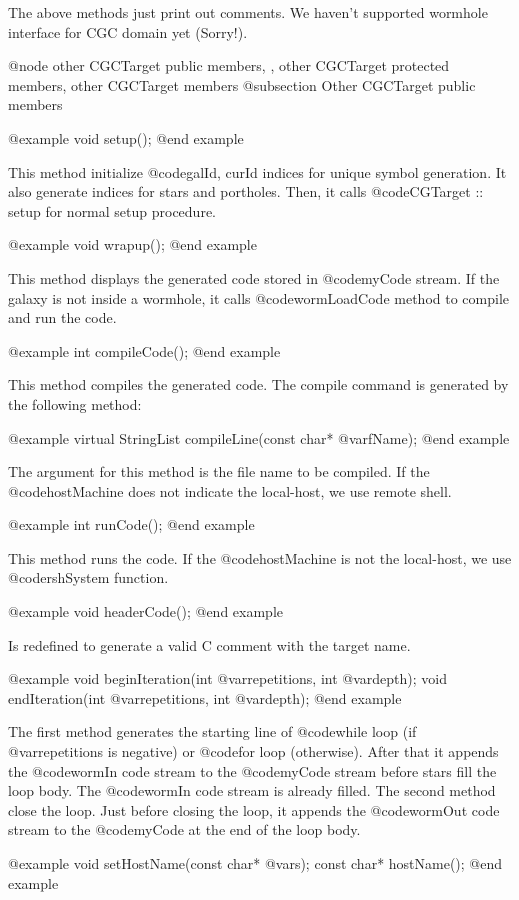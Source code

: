 {The above methods just print out comments. We haven't supported
wormhole interface for CGC domain yet (Sorry!).

@node other CGCTarget public members, , other CGCTarget protected members, other CGCTarget members
@subsection Other CGCTarget public members

@example
void setup();
@end example

This method initialize @code{galId, curId} indices for unique symbol
generation. It also generate indices for stars and portholes.
Then, it calls @code{CGTarget :: setup} for normal setup procedure.

@example
void wrapup();
@end example

This method displays the generated code stored in @code{myCode} stream.
If the galaxy is not inside a wormhole, it calls @code{wormLoadCode}
method to compile and run the code.

@example
int compileCode();
@end example

This method compiles the generated code. The compile command is generated
by the following method:

@example
virtual StringList compileLine(const char* @var{fName});
@end example

The argument for this method is the file name to be compiled. If the
@code{hostMachine} does not indicate the local-host, we use remote
shell.

@example
int runCode();
@end example

This method runs the code. If the @code{hostMachine} is not the
local-host, we use @code{rshSystem} function.

@example
void headerCode();
@end example

Is redefined to generate a valid C comment with the target name.

@example
void beginIteration(int @var{repetitions}, int @var{depth});
void endIteration(int @var{repetitions}, int @var{depth});
@end example

The first method generates the starting line of @code{while} loop
(if @var{repetitions} is negative) or @code{for} loop (otherwise).
After that it appends the @code{wormIn} code stream to the @code{myCode}
stream before stars fill the loop body. The @code{wormIn} code stream
is already filled. The second method close the loop. Just before closing
the loop, it appends the @code{wormOut} code stream to the @code{myCode}
at the end of the loop body.

@example
void setHostName(const char* @var{s});
const char* hostName();
@end example

}

